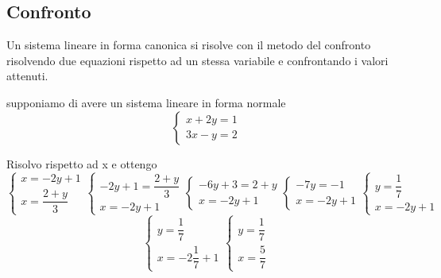 \subsection{Confronto}
\label{sec:Confronto}
Un sistema lineare in forma canonica si risolve con il metodo del confronto risolvendo due equazioni rispetto ad un stessa variabile e confrontando i valori attenuti.
\begin{esempiot}{}{}
supponiamo di avere un sistema lineare in forma normale
\[
\begin{cases}
	x+2y=1\\
	3x-y=2
\end{cases}
\]
\end{esempiot}
Risolvo rispetto ad x e ottengo
\[
\begin{cases}
	x=-2y+1\\
	x=\dfrac{2+y}{3}
\end{cases}
\begin{cases}
	-2y+1=\dfrac{2+y}{3}\\
		x=-2y+1
\end{cases}
\begin{cases}
	-6y+3=2+y\\
	x=-2y+1
\end{cases}
\begin{cases}
	-7y=-1\\
	x=-2y+1
\end{cases}
\begin{cases}
	y=\dfrac{1}{7}\\
	x=-2y+1
\end{cases}
\]
\[
\begin{cases}
	y=\dfrac{1}{7}\\
	x=-2\dfrac{1}{7}+1
\end{cases}
\begin{cases}
	y=\dfrac{1}{7}\\
	x=\dfrac{5}{7}
\end{cases}
\]

